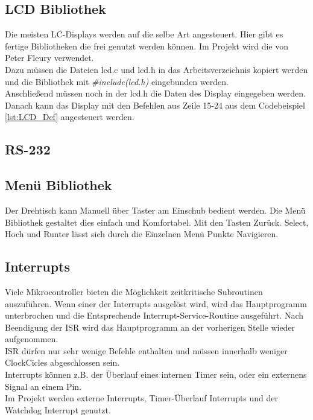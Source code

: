 \subsection{LCD Bibliothek}
Die meisten LC-Displays werden auf die selbe Art angesteuert. Hier gibt es fertige Bibliotheken die frei genutzt werden können. Im Projekt wird die von Peter Fleury\cite{uC:Fleury} verwendet.\\
Dazu müssen die Dateien lcd.c und lcd.h in das Arbeitsverzeichnis kopiert werden und die Bibliothek mit \emph{\#include(lcd.h)} eingebunden werden. \\
Anschließend müssen noch in der lcd.h die Daten des Display eingegeben werden.
Danach kann das Display mit den Befehlen aus Zeile 15-24 aus dem Codebeispiel \ref{lst:LCD_Def} angesteuert werden.

\lstset{language=Java, basicstyle=\footnotesize, showstringspaces=false, tabsize=4}

\subsection{RS-232}
\lstset{language=Java, basicstyle=\footnotesize, showstringspaces=false, tabsize=2}

\subsection{Menü Bibliothek}
Der Drehtisch kann Manuell über Taster am Einschub bedient werden. Die Menü Bibliothek gestaltet dies einfach und Komfortabel. Mit den Tasten Zurück. Select, Hoch und Runter lässt sich durch die Einzelnen Menü Punkte Navigieren.
\subsection{Interrupts}
Viele Mikrocontroller bieten die Möglichkeit zeitkritische Subroutinen auszuführen. Wenn einer der Interrupts ausgelöst wird, wird das Hauptprogramm unterbrochen und die Entsprechende Interrupt-Service-Routine ausgeführt. Nach Beendigung der ISR wird das Hauptprogramm an der vorherigen Stelle wieder aufgenommen.\\
ISR dürfen nur sehr wenige Befehle enthalten und müssen innerhalb weniger ClockCicles abgeschlossen sein. \\
Interrupts können z.B. der Überlauf eines internen Timer sein, oder ein externens Signal an einem Pin.\\
Im Projekt werden externe Interrupts, Timer-Überlauf Interrupts und der Watchdog Interrupt genutzt. 
